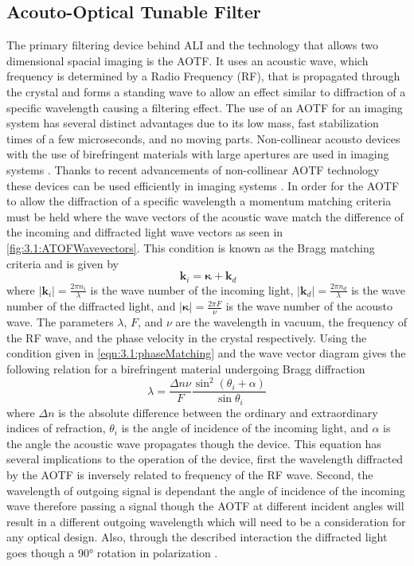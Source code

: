 \documentclass[12pt]{article}
\begin{document}
\subsection{Acouto-Optical Tunable Filter}

The primary filtering device behind ALI and the technology that allows two dimensional spacial imaging is the AOTF. It uses an acoustic wave, which frequency is determined by a Radio Frequency (RF), that is propagated through the crystal and forms a standing wave to allow an effect similar to diffraction of a specific wavelength causing a filtering effect. The use of an AOTF for an imaging system has several distinct advantages due to its low mass, fast stabilization times of a few microseconds, and no moving parts. Non-collinear acousto devices with the use of birefringent materials with large apertures are used in imaging systems \citep{Chang1974}. Thanks to recent advancements of non-collinear AOTF technology these devices can be used efficiently in imaging systems \citep{Georgiev2002, Voloshinov2007}. In order for the AOTF to allow the diffraction of a specific wavelength a momentum matching criteria must be held where the wave vectors of the acoustic wave match the difference of the incoming and diffracted light wave vectors as seen in \autoref{fig:3.1:ATOFWavevectors}. This condition is known as the Bragg matching criteria and is given by
\begin{equation}
    \ \mathbf{k}_{i} = \boldsymbol\kappa + \mathbf{k}_{d}
    \label{eqn:3.1:phaseMatching}
\end{equation}
where $\left|\mathbf{k}_{i}\right| = \frac{2\pi n_{i}}{\lambda}$ is the wave number of the incoming light, $\left|\mathbf{k}_{d}\right| = \frac{2\pi n_{d}}{\lambda}$ is the wave number of the diffracted light, and $\left|\boldsymbol\kappa\right| = \frac{2\pi F}{\nu}$ is the wave number of the acousto wave. The parameters $\lambda$, $F$, and $\nu$ are the wavelength in vacuum, the frequency of the RF wave, and the phase velocity in the crystal respectively. Using the condition given in \autoref{eqn:3.1:phaseMatching} and the wave vector diagram gives the following relation for a birefringent material undergoing Bragg diffraction
\begin{equation}
    \lambda  = \frac{\Delta n\nu}{F}\frac{\sin^{2}(\theta_{i}+\alpha)}{\sin\theta_{i}}
    \label{eqn:3.1:AOTFWavelengthDependance}
\end{equation}
where $\Delta n$ is the absolute difference between the ordinary and extraordinary indices of refraction, $\theta_{i}$ is the angle of incidence of the incoming light, and $\alpha$ is the angle the acoustic wave propagates though the device. This equation has several implications to the operation of the device, first the wavelength diffracted by the AOTF is inversely related to frequency of the RF wave. Second, the wavelength of outgoing signal is dependant the angle of incidence of the incoming wave therefore passing a signal though the AOTF at different incident angles will result in a different outgoing wavelength which will need to be a consideration for any optical design. Also, through the described interaction the diffracted light goes though a 90\si{\degree} rotation in polarization \citep{Voloshinov1996}.
\end{document}

